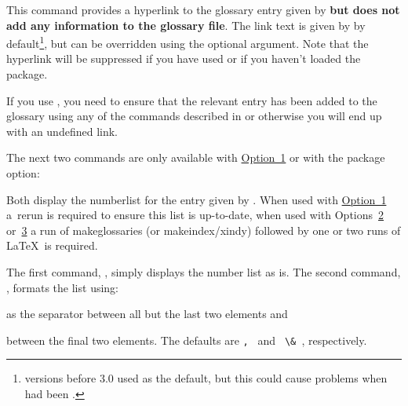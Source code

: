 \documentclass[report,inlinetitle]{nlctdoc}
\let\glsd\glsuseri
\newcommand*{\opt}[1]{\hyperlink{option#1}{Option~#1}}
\newcommand*{\optsor}[2]{Options~\hyperlink{option#1}{#1}
or~\hyperlink{option#2}{#2}}
\newcommand*{\gloskey}[2][newglossaryentry]{\csopt{#1}{#2}}
\begin{document}
\begin{definition}[\DescribeMacro{\glshyperlink}]
\end{definition}
This command provides a hyperlink to the glossary entry given by
 \textbf{but does not add any information to the
glossary file}. The link text is given by
 by default\footnote{versions before
3.0 used  as the default, but this could cause
problems when \gloskey{name} had been \glsd{sanitize}.}, but can be
overridden using the optional argument. Note that the hyperlink will
be suppressed if you have used  or if you
haven't loaded the  package.

\begin{important}
If you use , you need to ensure that the relevant
entry has been added to the glossary using any of the commands
described in  or 
otherwise you will end up with an undefined link.
\end{important}

The next two commands are only available with \opt1 or with the
 package option:
\begin{definition}[\DescribeMacro{\glsentrynumberlist}]
\end{definition}
\begin{definition}[\DescribeMacro{\glsdisplaynumberlist}]
\end{definition}
Both display the \gls{numberlist} for the entry given by
. When used with \opt1 a~rerun is required to ensure
this list is up-to-date, when used with \optsor23
a run of \gls{makeglossaries} (or \gls{makeindex}\slash\gls{xindy})
followed by one or two runs of \LaTeX\ is required.

The first command, , simply displays
the number list as is. The second command,
\linebreak{}, formats the list using:
\begin{definition}[\DescribeMacro{\glsnumlistsep}]
\end{definition}
as the separator between all but the last two elements and
\begin{definition}[\DescribeMacro{\glsnumlistlastsep}]
\end{definition}
between the final two elements. The defaults are
\verb*|, | and \verb*| \& |, respectively.
\end{document}
